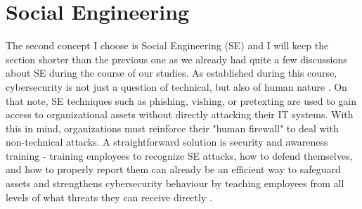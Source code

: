 \documentclass[12pt]{article}
\begin{document}
\section{Social Engineering}
The second concept I choose is Social Engineering (SE) and I will keep the section shorter than the previous one as we already had quite a few discussions about SE during the course of our studies.
\newline
As established during this course, cybersecurity is not just a question of technical, but also of human nature \cite{indrajit2017social}. On that note, SE techniques such as phishing, vishing, or pretexting are used to gain access to organizational assets without directly attacking their IT systems.
\newline
With this in mind, organizations must reinforce their "human firewall" to deal with non-technical attacks. A straightforward solution is security and awareness training - training employees to recognize SE attacks, how to defend themselves, and how to properly report them can already be an efficient way to safeguard assets and strengthens cybersecurity behaviour by teaching employees from all levels of what threats they can receive directly \cite{aldawood2018educating}.



\end{document}
